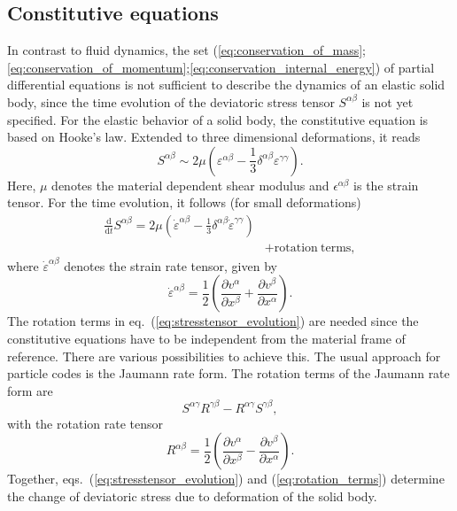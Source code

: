 \documentclass[10pt,fleqn,twoside]{article}
\begin{document}
\subsection{Constitutive equations}
In contrast to fluid dynamics, the set
(\ref{eq:conservation_of_mass};\ref{eq:conservation_of_momentum};\ref{eq:conservation_internal_energy}) of partial
differential equations is not sufficient to describe the dynamics of an elastic solid body, since the time evolution of
the deviatoric stress tensor $S^{\alpha \beta}$ is not yet specified. For the elastic behavior of a solid body, the
constitutive equation is based on Hooke's law. Extended to three dimensional deformations, it reads
%
\begin{equation}
 S^{\alpha \beta} \sim 2 \mu \left( \varepsilon^{\alpha \beta} - \frac{1}{3} \delta^{\alpha \beta} \varepsilon^{\gamma
  \gamma} \right).
\end{equation}
%
Here, $\mu$ denotes the material dependent shear modulus and $\epsilon^{\alpha \beta}$ is the strain tensor.
%
For the time evolution, it follows (for small deformations)
%
\begin{align}
 \label{eq:stresstensor_evolution}
 \frac{\mathrm{d}}{\mathrm{d}t}S^{\alpha \beta} =  2\mu \left( \dot{\varepsilon}^{\alpha \beta} - \frac{1}{3}
 \delta^{\alpha \beta} \dot{\varepsilon}^{\gamma \gamma} \right) & \\  & +  \mathrm{rotation~terms,} \nonumber
\end{align}
%
%
where $\dot{\varepsilon}^{\alpha \beta}$ denotes the strain rate tensor, given by
\begin{equation}
 \label{eq:strain_rate_tensor}
 \dot{\varepsilon}^{\alpha \beta} = \frac{1}{2} \left( \frac{\partial v^\alpha}{\partial x^\beta} + \frac{\partial
  v^\beta}{\partial x^\alpha} \right).
\end{equation}
%
The rotation terms in eq.~(\ref{eq:stresstensor_evolution}) are needed since the constitutive equations have to be
independent from the material frame of reference. There are various possibilities to achieve this. The usual approach
for particle codes is the Jaumann rate form. The rotation terms
of the Jaumann rate form are
%
\begin{equation}
 \label{eq:rotation_terms}
 S^{\alpha \gamma} R^{\gamma \beta} - R^{\alpha \gamma} S^{\gamma \beta},
\end{equation}
%
with the rotation rate tensor
%
\begin{equation}
 R^{\alpha \beta} = \frac{1}{2} \left( \frac{\partial v^\alpha}{\partial x^\beta} - \frac{\partial v^\beta}{\partial x^\alpha}
 \right).
\end{equation}
%
Together, eqs.~(\ref{eq:stresstensor_evolution}) and (\ref{eq:rotation_terms}) determine the change of deviatoric
stress due to deformation of the solid body.
%
\end{document}

